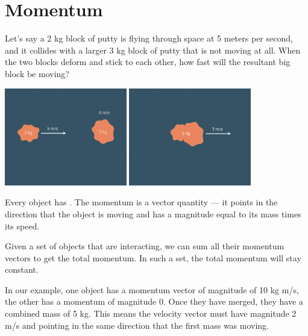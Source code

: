 \chapter{Momentum}

Let's say a 2 kg block of putty is flying through space at 5 meters
per second, and it collides with a larger 3 kg block of putty that is not
moving at all. When the two blocks deform and stick to each other, how
fast will the resultant big block be moving?
\begin{center}
  
  \includegraphics[width=0.4\textwidth]{putty1.png}
  \includegraphics[width=0.4\textwidth]{putty2.png}
\end{center}


Every object has . The momentum is a vector
quantity --- it points in the direction that the object is moving and has
a magnitude equal to its mass times its speed.

Given a set of objects that are interacting, we can sum all their
momentum vectors to get the total momentum. In such a set, the total
momentum will stay constant.

In our example, one object has a momentum vector of magnitude of
10 kg m/s, the other has a momentum of magnitude 0.  Once they have
merged, they have a combined mass of 5 kg.  This means the velocity vector
must have magnitude 2 m/s and pointing in the same direction that the
first mass was moving.

